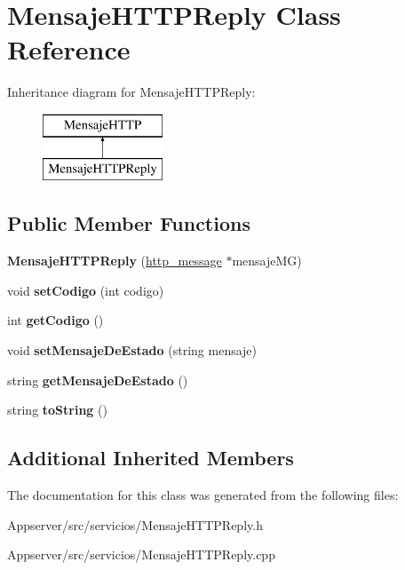 \hypertarget{classMensajeHTTPReply}{}\section{Mensaje\+H\+T\+T\+P\+Reply Class Reference}
\label{classMensajeHTTPReply}
Inheritance diagram for Mensaje\+H\+T\+T\+P\+Reply\+:\begin{figure}[H]
\begin{center}
\leavevmode
\includegraphics[height=2.000000cm]{classMensajeHTTPReply}
\end{center}
\end{figure}
\subsection*{Public Member Functions}
\begin{DoxyCompactItemize}
\item 
{\bfseries Mensaje\+H\+T\+T\+P\+Reply} (\hyperlink{structhttp__message}{http\+\_\+message} $\ast$mensaje\+MG)\hypertarget{classMensajeHTTPReply_a6c8940c801dd402d16ea10d4ca82af0f}{}\label{classMensajeHTTPReply_a6c8940c801dd402d16ea10d4ca82af0f}

\item 
void {\bfseries set\+Codigo} (int codigo)\hypertarget{classMensajeHTTPReply_a7b53a4451eceaf625243229dfff4a4e1}{}\label{classMensajeHTTPReply_a7b53a4451eceaf625243229dfff4a4e1}

\item 
int {\bfseries get\+Codigo} ()\hypertarget{classMensajeHTTPReply_a1b3a8cc18ee5f15a3444859c36c86e7f}{}\label{classMensajeHTTPReply_a1b3a8cc18ee5f15a3444859c36c86e7f}

\item 
void {\bfseries set\+Mensaje\+De\+Estado} (string mensaje)\hypertarget{classMensajeHTTPReply_abeee087f10205a27689c11134af41053}{}\label{classMensajeHTTPReply_abeee087f10205a27689c11134af41053}

\item 
string {\bfseries get\+Mensaje\+De\+Estado} ()\hypertarget{classMensajeHTTPReply_a5a9a80b64a8c0f9bf76fbd7917bd8323}{}\label{classMensajeHTTPReply_a5a9a80b64a8c0f9bf76fbd7917bd8323}

\item 
string {\bfseries to\+String} ()\hypertarget{classMensajeHTTPReply_a95c2acf562527553dc7218827c3d2049}{}\label{classMensajeHTTPReply_a95c2acf562527553dc7218827c3d2049}

\end{DoxyCompactItemize}
\subsection*{Additional Inherited Members}


The documentation for this class was generated from the following files\+:\begin{DoxyCompactItemize}
\item 
Appserver/src/servicios/Mensaje\+H\+T\+T\+P\+Reply.\+h\item 
Appserver/src/servicios/Mensaje\+H\+T\+T\+P\+Reply.\+cpp\end{DoxyCompactItemize}
